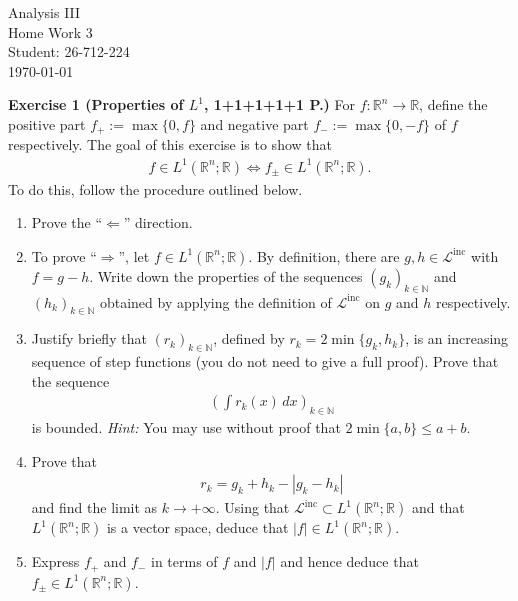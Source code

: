 \documentclass[12pt,a4paper]{article}
\begin{document}
\begin{titlepage}
\centering
\vspace*{\fill}
{\Huge Analysis III} \\[0.5cm]
{\Huge Home Work 3}\\[1.5cm]
{\Large Student: 26-712-224}\\[0.5cm]
{\Large \today}
\vspace*{\fill}
\end{titlepage}

\newpage
\textbf{Exercise 1 (Properties of $L^1$, 1+1+1+1+1 P.)}
For $f:\mathbb{R}^n\to\mathbb{R}$, define the positive part $f_+:=\max\{0,f\}$ and negative part $f_-:=\max\{0,-f\}$ of $f$ respectively. The goal of this exercise is to show that
\begin{align*}
f\in L^1(\mathbb{R}^n;\mathbb{R}) \iff f_{\pm}\in L^1(\mathbb{R}^n;\mathbb{R}).
\end{align*}
To do this, follow the procedure outlined below.
\begin{enumerate}
\item[(a)] Prove the ``$\Leftarrow$'' direction.
\item[(b)] To prove ``$\Rightarrow$'', let $f\in L^1(\mathbb{R}^n;\mathbb{R})$. By definition, there are $g,h\in\mathcal{L}^{\mathrm{inc}}$ with $f=g-h$. Write down the properties of the sequences $(g_k)_{k\in\mathbb{N}}$ and $(h_k)_{k\in\mathbb{N}}$ obtained by applying the definition of $\mathcal{L}^{\mathrm{inc}}$ on $g$ and $h$ respectively.
\item[(c)] Justify briefly that $(r_k)_{k\in\mathbb{N}}$, defined by $r_k=2\min\{g_k,h_k\}$, is an increasing sequence of step functions (you do not need to give a full proof). Prove that the sequence
\begin{align*}
\left(\int r_k(x)\,dx\right)_{k\in\mathbb{N}}
\end{align*}
is bounded. \textit{Hint:} You may use without proof that $2\min\{a,b\}\leq a+b$.
\item[(d)] Prove that
\begin{align*}
r_k=g_k+h_k-|g_k-h_k|
\end{align*}
and find the limit as $k\to+\infty$. Using that $\mathcal{L}^{\mathrm{inc}}\subset L^1(\mathbb{R}^n;\mathbb{R})$ and that $L^1(\mathbb{R}^n;\mathbb{R})$ is a vector space, deduce that $|f|\in L^1(\mathbb{R}^n;\mathbb{R})$.
\item[(e)] Express $f_+$ and $f_-$ in terms of $f$ and $|f|$ and hence deduce that $f_{\pm}\in L^1(\mathbb{R}^n;\mathbb{R})$.
\end{enumerate}
\end{document}
